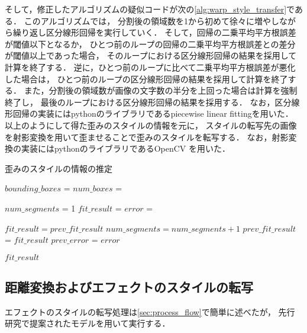 \documentclass[\homedir/main.tex]{subfiles}
\begin{document}
そして，修正したアルゴリズムの疑似コードが次の\cref{alg:warp_style_transfer}である．
このアルゴリズムでは，
分割後の領域数を1から初めて徐々に増やしながら繰り返し区分線形回帰を実行していく．
そして，回帰の二乗平均平方根誤差が閾値以下となるか，
ひとつ前のループの回帰の二乗平均平方根誤差との差分が閾値以上であった場合，
そのループにおける区分線形回帰の結果を採用して計算を終了する．
逆に，ひとつ前のループに比べて二乗平均平方根誤差が悪化した場合は，
ひとつ前のループの区分線形回帰の結果を採用して計算を終了する．
また，分割後の領域数が画像の文字数の半分を上回った場合は計算を強制終了し，
最後のループにおける区分線形回帰の結果を採用する．
なお，区分線形回帰の実装にはpythonのライブラリであるpiecewise linear fittingを用いた．
以上のようにして得た歪みのスタイルの情報を元に，
スタイルの転写先の画像を射影変換を用いて歪ませることで歪みのスタイルを転写する．
なお，射影変換の実装にはpythonのライブラリであるOpenCV を用いた．

\begin{algorithm}[h]
    \caption{歪みのスタイルの情報の推定}
    \label{alg:warp_style_transfer}
    \begin{algorithmic}[1]
        \State $bounding\_boxes$ = 
        \State $num\_boxes$ = 

        \State $num\_segments$ = 1
        \State $fit\_result$ = 
        \State $error$ = 

        \State $fit\_result = prev\_fit\_result$
        \State \Break
        \State \Break
        \EndIf
        \EndIf
        \State $num\_segments = num\_segments + 1$
        \State $prev\_fit\_result$ = $fit\_result$
        \State $prev\_error$ = $error$

        \EndWhile
        \State \Return $fit\_result$
        \EndFunction

    \end{algorithmic}
\end{algorithm}

\subsection{距離変換およびエフェクトのスタイルの転写}
エフェクトのスタイルの転写処理は\cref{sec:process_flow}で簡単に述べたが，
先行研究\cite{typography2019}で提案されたモデルを用いて実行する．



\printBibForSubfiles
\end{document}
